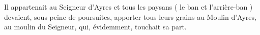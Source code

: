 Il appartenait au Seigneur d’Ayres et tous les paysans ( le ban et l’arrière-ban ) devaient, sous
peine de poursuites, apporter tous leurs grains au Moulin d’Ayres, au moulin du Seigneur,
qui, évidemment, touchait sa part.

\vspace{1.3cm}


\begin{center}
\end{center}
